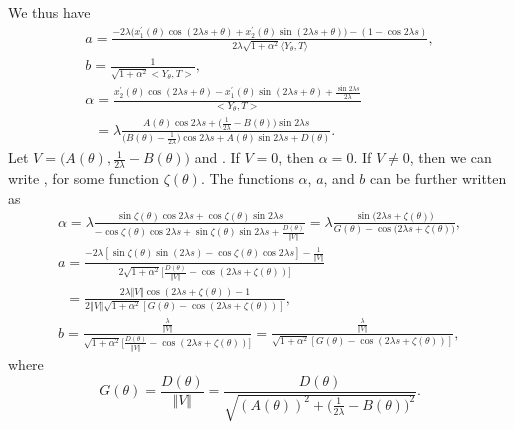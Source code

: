 \documentclass[10pt,a4paper]{amsart}
\numberwithin{equation}{section}
\begin{document}
We thus have
\begin{gather}
a =\frac{-2\lambda \bigl( x^{\prime }_{1}( \theta ) \cos (
2\lambda s+\theta ) +x^{\prime }_{2}( \theta ) \sin (
2\lambda s+\theta ) \bigr) -( 1-\cos 2\lambda s) }{
2\lambda \sqrt{1+\alpha ^{2}} \langle Y_{\theta },T \rangle },\nonumber \\
b =\frac{1}{\sqrt{1+\alpha ^{2}}\big<Y_{\theta },T\big>}, \nonumber\\
\alpha =\frac{x_{2}^{\prime }(\theta )\cos {(2\lambda s+\theta )}
-x_{1}^{\prime }(\theta )\sin {(2\lambda s+\theta )}+\frac{\sin {2\lambda s}
}{2\lambda }}{\big<Y_{\theta },T\big>} \nonumber\\
\phantom{\alpha}{} =\lambda \frac{A(\theta )\cos {2\lambda s}+\bigl( \frac{1}{2\lambda }
-B(\theta )\bigr) \sin {2\lambda s}}{\bigl( B(\theta )-\frac{1}{2\lambda }
\bigr) \cos {2\lambda s}+A(\theta )\sin {2\lambda s}+D(\theta )}.\label{forinv}
\end{gather}
Let $V=\bigl( A(\theta ),\frac{1}{2\lambda }-B(\theta )\bigr) $ and .
If $V=0$, then $\alpha=0$. If $V\neq 0$, then we can write
,
for some function $\zeta {(\theta )}$. The functions $\alpha $, $a$, and $b$
can be further written as
\begin{gather*}%
\alpha =\lambda \frac{\sin {\zeta (\theta )}\cos {2\lambda s}+\cos {\zeta
(\theta )}\sin {2\lambda s}}{-\cos {\zeta (\theta )}\cos {2\lambda s}+\sin {
\zeta (\theta )}\sin {2\lambda s}+\frac{D(\theta )}{ \Vert V
\Vert }} =\lambda \frac{\sin {\bigl(2\lambda s+\zeta {(\theta )}\bigr)}}{G(\theta
)-\cos {\bigl(2\lambda s+\zeta {(\theta )}\bigr)}}, \\
a=\frac{-2\lambda [ \sin \zeta ( \theta ) \sin (
2\lambda s) -\cos \zeta ( \theta ) \cos 2\lambda s] -
\frac{1}{\Vert V \Vert }}{2\sqrt{1+\alpha ^{2}}\bigl[ \frac{
D( \theta ) }{\Vert V \Vert }-\cos ( 2\lambda
s+\zeta ( \theta ) ) \bigr] } \\
\phantom{a}{} =\frac{2\lambda \Vert V \Vert \cos ( 2\lambda s+\zeta
( \theta ) ) -1}{2\Vert V \Vert \sqrt{1+\alpha
^{2}}[ G( \theta ) -\cos ( 2\lambda s+\zeta (
\theta ) ) ] }, \\
b =\frac{\frac{\lambda }{\Vert V \Vert }}{\sqrt{1+\alpha ^{2}}
\bigl[ \frac{D( \theta ) }{\Vert V \Vert }-\cos
( 2\lambda s+\zeta ( \theta ) ) \bigr] } =\frac{\frac{\lambda }{\Vert V \Vert }}{\sqrt{1+\alpha ^{2}}
[ G( \theta ) -\cos ( 2\lambda s+\zeta ( \theta
) ) ] },
\end{gather*}
where
\begin{equation}\label{gdefn}
G(\theta )=\frac{D(\theta )}{\Vert V \Vert }=\frac{D(\theta )}{
\sqrt{(A(\theta ))^{2}+\bigl(\frac{1}{2\lambda }-B(\theta )\bigr)^{2}}}.
\end{equation}
\end{document}
